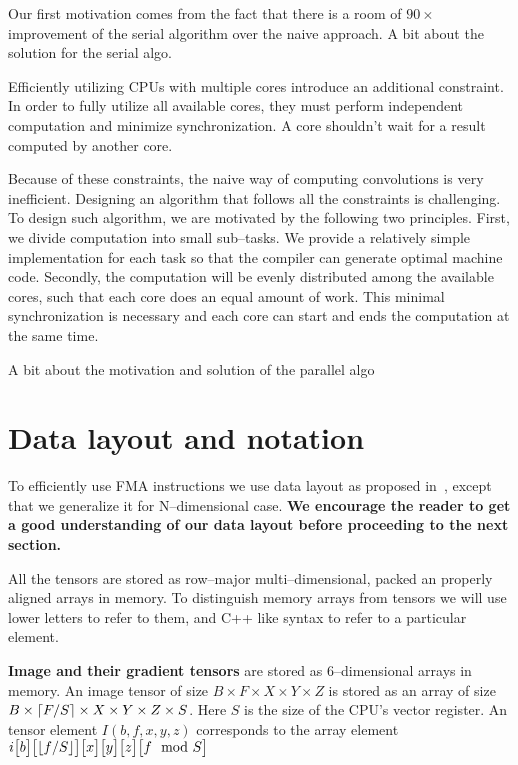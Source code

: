   Our first motivation comes from the fact that there is a room of $90
  \times$ improvement of the serial algorithm over the naive approach.
  A bit about the solution for the serial algo.

  Efficiently utilizing CPUs with multiple cores introduce an
  additional constraint.  In order to fully utilize all available
  cores, they must perform independent computation and minimize
  synchronization.  A core shouldn't wait for a result computed by
  another core.

  Because of these constraints, the naive way of computing
  convolutions is very inefficient.  Designing an algorithm that
  follows all the constraints is challenging.  To design such
  algorithm, we are motivated by the following two principles.  First,
  we divide computation into small sub--tasks.  We provide a
  relatively simple implementation for each task so that the compiler
  can generate optimal machine code.  Secondly, the computation will
  be evenly distributed among the available cores, such that each core
  does an equal amount of work.  This minimal synchronization is
  necessary and each core can start and ends the computation at the
  same time.

  A bit about the motivation and solution of the parallel algo

\section{Data layout and notation}

  To efficiently use FMA instructions we use data layout as proposed
  in~\cite{jeffers2016knl, cpu-myth}, except that we generalize it for
  N--dimensional case.  {\bf We encourage the reader to get a good
    understanding of our data layout before proceeding to the next
    section.}

  All the tensors are stored as row--major multi--dimensional, packed
  an properly aligned arrays in memory.  To distinguish memory arrays
  from tensors we will use lower letters to refer to them, and C++
  like syntax to refer to a particular element.

  {\bf Image and their gradient tensors} are stored as 6--dimensional
  arrays in memory.  An image tensor of size $B \times F \times X
  \times Y \times Z$ is stored as an array of size $B \times
  \lceil F/S\rceil \times X \times Y \times Z \times S$.  Here $S$ is the
  size of the CPU's vector register.  An tensor element $I(b,f,x,y,z)$
  corresponds to the array element
  $i\big[b\big]\big[\lfloor f/S\rfloor\big]\big[x\big]\big[y\big]\big[z\big]\big[f\mod S\big]$

